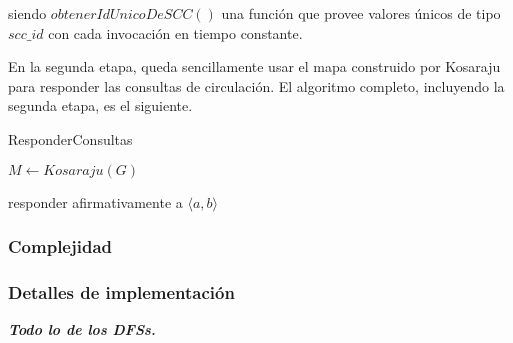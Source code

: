 \medskip

siendo $obtenerIdUnicoDeSCC()$ una función que provee valores únicos de tipo $scc\_id$ con cada invocación en tiempo constante.

\medskip

En la segunda etapa, queda sencillamente usar el mapa construido por Kosaraju para responder las consultas de circulación. El algoritmo completo, incluyendo la segunda etapa, es el siguiente.

\bigskip

\begin{algorithm}[H]
	\caption{ResponderConsultas}

    $M \gets \mathit{Kosaraju(G)}$ \;

     {
         {
            responder afirmativamente a $\langle a, b \rangle$
        } 
    }
\end{algorithm}

\subsubsection{Complejidad}

\subsubsection{Detalles de implementación}

\textit{\textbf{Todo lo de los DFSs.}}
